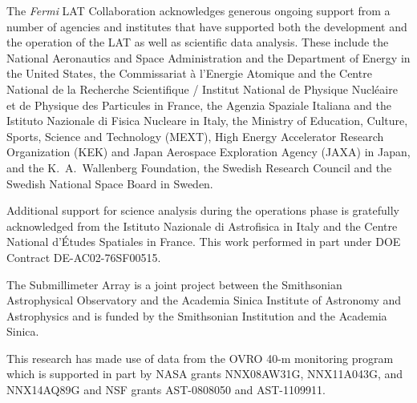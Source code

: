 \documentclass[twocolumn,linenumbers]{aastex62}
\begin{document}
\begin{acknowledgments}
The \textit{Fermi} LAT Collaboration acknowledges generous ongoing support
from a number of agencies and institutes that have supported both the
development and the operation of the LAT as well as scientific data analysis.
These include the National Aeronautics and Space Administration and the
Department of Energy in the United States, the Commissariat \`a l'Energie Atomique
and the Centre National de la Recherche Scientifique / Institut National de Physique
Nucl\'eaire et de Physique des Particules in France, the Agenzia Spaziale Italiana
and the Istituto Nazionale di Fisica Nucleare in Italy, the Ministry of Education,
Culture, Sports, Science and Technology (MEXT), High Energy Accelerator Research
Organization (KEK) and Japan Aerospace Exploration Agency (JAXA) in Japan, and
the K.~A.~Wallenberg Foundation, the Swedish Research Council and the
Swedish National Space Board in Sweden.
 
Additional support for science analysis during the operations phase is gratefully
acknowledged from the Istituto Nazionale di Astrofisica in Italy and the Centre
National d'\'Etudes Spatiales in France. This work performed in part under DOE
Contract DE-AC02-76SF00515.

The Submillimeter Array is a joint project between the Smithsonian Astrophysical Observatory and the Academia Sinica Institute of Astronomy and Astrophysics and is funded by the Smithsonian Institution and the Academia Sinica.

This research has made use of data from the OVRO 40-m monitoring program~\citep{2011ApJS..194...29R} which is supported in part by NASA grants NNX08AW31G, NNX11A043G, and NNX14AQ89G and NSF grants AST-0808050 and AST-1109911.
\end{acknowledgments}
\end{document}

